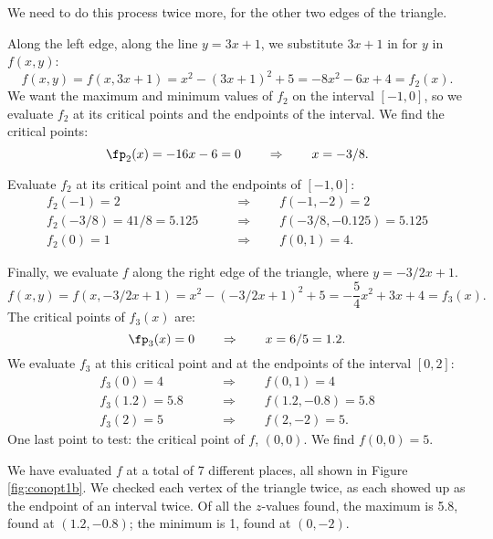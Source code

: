 {We need to do this process twice more, for the other two edges of the triangle.

Along the left edge, along the line $y=3x+1$, we substitute $3x+1$ in for $y$ in $f(x,y)$:
$$f(x,y) = f(x,3x+1) = x^2-(3x+1)^2+5 = -8x^2-6x+4 = f_2(x).$$
We want the maximum and minimum values of $f_2$ on the interval $[-1,0]$, so we evaluate $f_2$ at its critical points and the endpoints of the interval. We find the critical points:
$$\fp_2(x) = -16x-6=0 \qquad \Rightarrow \qquad x=-3/8.$$

Evaluate $f_2$ at its critical point and the endpoints of $[-1,0]$:
\begin{align*}
f_2(-1) = 2 \qquad&\Rightarrow\qquad f(-1,-2) = 2\\
f_2(-3/8) = 41/8=5.125  \qquad&\Rightarrow \qquad f(-3/8,-0.125) = 5.125\\
f_2(0) = 1 \qquad&\Rightarrow \qquad f(0,1) = 4.
\end{align*}

Finally, we evaluate $f$ along the right edge of the triangle, where $y = -3/2x+1$. 
$$f(x,y) = f(x,-3/2x+1) = x^2-(-3/2x+1)^2+5 = -\frac54x^2+3x+4=f_3(x).$$
The critical points of $f_3(x)$ are:
$$\fp_3(x) = 0 \qquad \Rightarrow \qquad x=6/5=1.2.$$
We evaluate $f_3$ at this critical point and at the endpoints of the interval $[0,2]$:
\begin{align*}
f_3(0) = 4 \qquad&\Rightarrow\qquad f(0,1) = 4\\
f_3(1.2) = 5.8  \qquad&\Rightarrow \qquad f(1.2,-0.8) = 5.8\\
f_3(2) = 5 \qquad&\Rightarrow \qquad f(2,-2) = 5.
\end{align*}
One last point to test: the critical point of $f$, $(0,0)$. We find $f(0,0) = 5$.

We have evaluated $f$ at a total of 7 different places, all shown in Figure \ref{fig:conopt1b}. We checked each vertex of the triangle twice, as each showed up as the endpoint of an interval twice. Of all the $z$-values found, the maximum is 5.8, found at $(1.2,-0.8)$; the minimum is 1, found at $(0,-2)$. 
}\\


